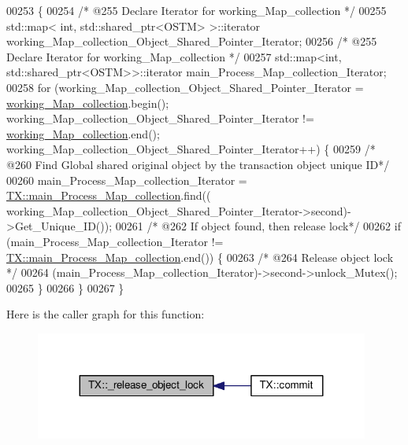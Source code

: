 \begin{DoxyCode}
00253                              \{
00254     \textcolor{comment}{/* @255 Declare Iterator for working\_Map\_collection */}
00255     std::map< int, std::shared\_ptr<OSTM> >::iterator working\_Map\_collection\_Object\_Shared\_Pointer\_Iterator;
00256     \textcolor{comment}{/* @255 Declare Iterator for working\_Map\_collection */}
00257     std::map<int, std::shared\_ptr<OSTM>>::iterator main\_Process\_Map\_collection\_Iterator;
00258     \textcolor{keywordflow}{for} (working\_Map\_collection\_Object\_Shared\_Pointer\_Iterator = 
      \hyperlink{class_t_x_a81aafda16e2f20e36ec6c68e584668ff_a81aafda16e2f20e36ec6c68e584668ff}{working\_Map\_collection}.begin(); working\_Map\_collection\_Object\_Shared\_Pointer\_Iterator
       != \hyperlink{class_t_x_a81aafda16e2f20e36ec6c68e584668ff_a81aafda16e2f20e36ec6c68e584668ff}{working\_Map\_collection}.end(); 
      working\_Map\_collection\_Object\_Shared\_Pointer\_Iterator++) \{
00259             \textcolor{comment}{/* @260 Find Global shared original object by the transaction object unique ID*/}
00260             main\_Process\_Map\_collection\_Iterator = 
      \hyperlink{class_t_x_a1a45d726894190695314464d7cd97c29_a1a45d726894190695314464d7cd97c29}{TX::main\_Process\_Map\_collection}.find((
      working\_Map\_collection\_Object\_Shared\_Pointer\_Iterator->second)->Get\_Unique\_ID());
00261             \textcolor{comment}{/* @262 If object found, then release lock*/}
00262             \textcolor{keywordflow}{if} (main\_Process\_Map\_collection\_Iterator != 
      \hyperlink{class_t_x_a1a45d726894190695314464d7cd97c29_a1a45d726894190695314464d7cd97c29}{TX::main\_Process\_Map\_collection}.end()) \{
00263                 \textcolor{comment}{/* @264 Release object lock */}
00264                 (main\_Process\_Map\_collection\_Iterator)->second->unlock\_Mutex();
00265             \} 
00266         \}
00267 \}
\end{DoxyCode}


Here is the caller graph for this function\+:\nopagebreak
\begin{figure}[H]
\begin{center}
\leavevmode
\includegraphics[width=311pt]{class_t_x_a4c13d2015dc15d0f788fa9a1413f0463_a4c13d2015dc15d0f788fa9a1413f0463_icgraph}
\end{center}
\end{figure}


